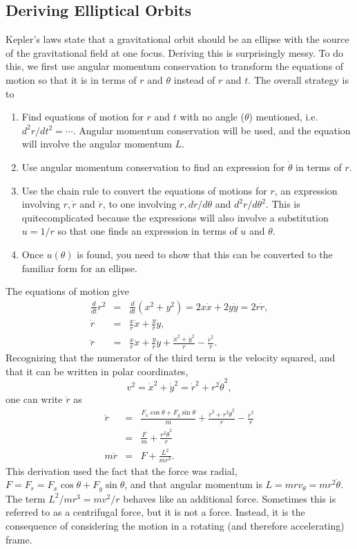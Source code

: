 \subsection{Deriving Elliptical Orbits}

Kepler's laws state that a gravitational orbit should be an ellipse with the source of the gravitational field at one focus. Deriving this is surprisingly messy. To do this, we first use angular momentum conservation to transform the equations of motion so that it is in terms of $r$ and $\theta$ instead of $r$ and $t$. The overall strategy is to
\begin{enumerate}\itemsep=0pt
\item Find equations of motion for $r$ and $t$ with no angle ($\theta$) mentioned, i.e. $d^2r/dt^2=\cdots$. Angular momentum conservation will be used, and the equation will involve the angular momentum $L$.
\item Use angular momentum conservation to find an expression for $\dot{\theta}$ in terms of $r$.
\item Use the chain rule to convert the equations of motions for $r$, an expression involving $r,\dot{r}$ and $\ddot{r}$, to one involving $r,dr/d\theta$ and $d^2r/d\theta^2$. This is quitecomplicated because the expressions will also involve a substitution $u=1/r$ so that one finds an expression in terms of $u$ and $\theta$.
\item Once $u(\theta)$ is found, you need to show that this can be converted to the familiar form for an ellipse.
\end{enumerate}

The equations of motion give
\begin{eqnarray}
\label{eq:radialeqofmotion}
\frac{d}{dt}r^2&=&\frac{d}{dt}(x^2+y^2)=2x\dot{x}+2y\dot{y}=2r\dot{r},\\
\nonumber
\dot{r}&=&\frac{x}{r}\dot{x}+\frac{y}{r}\dot{y},\\
\nonumber
\ddot{r}&=&\frac{x}{r}\ddot{x}+\frac{y}{r}\ddot{y}
+\frac{\dot{x}^2+\dot{y}^2}{r}
-\frac{\dot{r}^2}{r}.
\end{eqnarray}
Recognizing that the numerator of the third term is the velocity squared, and that it can be written in polar coordinates, 
\begin{equation}
v^2=\dot{x}^2+\dot{y}^2=\dot{r}^2+r^2\dot{\theta}^2,
\end{equation}
one can write $\ddot{r}$ as
\begin{eqnarray}
\label{eq:radialeqofmotion2}
\ddot{r}&=&\frac{F_x\cos\theta+F_y\sin\theta}{m}+\frac{\dot{r}^2+r^2\dot{\theta}^2}{r}-\frac{\dot{r}^2}{r}\\
\nonumber
&=&\frac{F}{m}+\frac{r^2\dot{\theta}^2}{r}\\
\nonumber
m\ddot{r}&=&F+\frac{L^2}{mr^3}.
\end{eqnarray}
This derivation used the fact that the force was radial, $F=F_r=F_x\cos\theta+F_y\sin\theta$, and that angular momentum is $L=mrv_{\theta}=mr^2\dot{\theta}$. The term $L^2/mr^3=mv^2/r$ behaves like an additional force. Sometimes this is referred to as a centrifugal force, but it is not a force. Instead, it is the consequence of considering the motion in a rotating (and therefore accelerating) frame.

